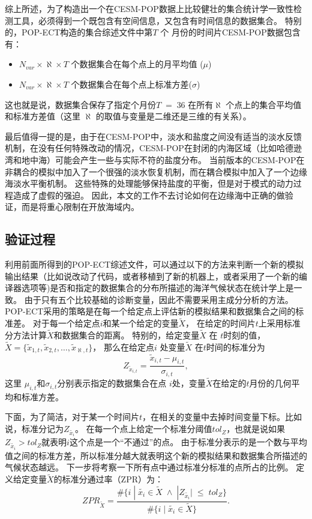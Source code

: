  
综上所述，为了构造出一个在CESM-POP数据上比较健壮的集合统计学一致性检测工具，必须得到一个既包含有空间信息，又包含有时间信息的数据集合。
特别的，POP-ECT构造的集合综述文件中第$T$ 个 月份的时间片CESM-POP数据包含有：
\begin{itemize}
 \item $N_{var} \times \aleph \times T$ 个数据集合在每个点上的月平均值 ($\mu$)
 \item $N_{var} \times \aleph \times T$ 个数据集合在每个点上标准方差($\sigma$)
 \end{itemize}
 这也就是说，数据集合保存了指定个月份$T \;=\; 36$ 在所有$\aleph$ 个点上的集合平均值和标准方差值（这里 $\aleph$ 的取值与变量是二维还是三维的有关系）。
 

最后值得一提的是，由于在CESM-POP中，淡水和盐度之间没有适当的淡水反馈机制，在没有任何特殊改动的情况，CESM-POP在封闭的内海区域（比如哈德逊湾和地中海）可能会产生一些与实际不符的盐度分布。
当前版本的CESM-POP在非耦合的模拟中加入了一个很强的淡水恢复机制，而在耦合模拟中加入了一个边缘海淡水平衡机制。
这些特殊的处理能够保持盐度的平衡，但是对于模式的动力过程造成了虚假的强迫。
因此，本文的工作不去讨论如何在边缘海中正确的做验证，而是将重心限制在开放海域内。

\subsection{验证过程}
\label{verify:ECTprocess}
 
利用前面所得到的POP-ECT综述文件，可以通过以下的方法来判断一个新的模拟输出结果（比如说改动了代码，或者移植到了新的机器上，或者采用了一个新的编译器选项等)是否和指定的数据集合的分布所描述的海洋气候状态在统计学上是一致。 
由于只有五个比较基础的诊断变量，因此不需要采用主成分分析的方法。 
POP-ECT采用的策略是在每一个给定点上评估新的模拟结果和数据集合之间的标准差。
对于每一个给定点$i$和某一个给定的变量$\tilde{{X}}$， 在给定的时间片$t$上采用标准分方法计算$\tilde{{X}}$和数据集合的距离。 
特别的，给定变量$\tilde{{X}}$ 在 $t$时刻的值，$\tilde{{X}} = \{ \tilde{x}_{1,t}, \tilde{x}_{2,t}, \dots, \tilde{x}_{\aleph,t}\}$， 那么在给定点$i$ 处变量$\tilde{{X}}$ 在$t$时间的标准分为
\begin{equation*}
Z_{\tilde{x}_{i,t}}=  \frac{\tilde{x}_{i,t} -\mu_{i,t}}{\sigma_{i,t}},
\end{equation*}
这里 $\mu_{i,t}$和$\sigma_{i,t}$分别表示指定的数据集合在点 $i$处，变量$\tilde{{X}}$在给定的$t$月份的几何平均和标准方差。  

 
下面，为了简洁，对于某一个时间片$t$，在相关的变量中去掉时间变量下标。比如说，标准分记为$Z_{\tilde{x_i}}$。 
在每一个点上给定一个标准分阈值$tol_{Z}$，也就是说如果 $Z_{\tilde{x_i}} > tol_{Z}$就表明$i$这个点是一个“不通过”的点。 
由于标准分表示的是一个数与平均值之间的标准方差，所以标准分越大就表明这个新的模拟结果和数据集合所描述的气候状态越远。 
下一步将考察一下所有点中通过标准分标准的点所占的比例。 定义给定变量$\tilde{X}$的标准分通过率（ZPR）为：
\begin{equation}\label{e:zpr}
ZPR_{\tilde{X}} = \frac{ \#\{i \;|\; \tilde{x_i} \in \tilde{X} \; \land \; |Z_{\tilde{x_i}}| \; \leq \; tol_{Z}\} }{\#\{i \;|\; \tilde{x_i} \in \tilde{X} \} }.
\end{equation}
 
